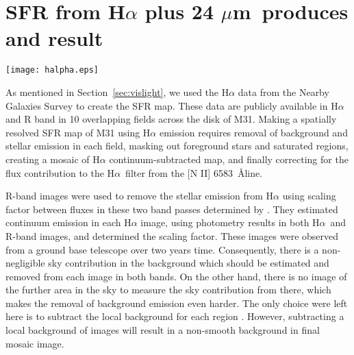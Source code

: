 \documentclass[useAMS,usenatbib]{mn2e}
\newcommand \halpha    {H$\alpha $\ }
\newcommand \um    {$\mu$m\ }
\begin{document}

\appendix
\section{SFR from H$\alpha$ plus 24 \um produces and result}
\label{app:halpha}


\begin{figure*}
\centering
\texttt{[image: halpha.eps]}
\caption{Mosaic created using the Montage programme from six fields of H$\alpha$ emission maps of the M31 from \cite{Massey07}. The result image from Montage was continuum subtracted and masked out for all point sources. Centre of the galaxy was masked out due to saturation of data in an R-band image.}
\label{fig:halpha}
\end{figure*}

As mentioned in Section~\ref{sec:vislight}, we used the H$\alpha$ data from the Nearby Galaxies Survey \citep{Massey07} to create the SFR map. These data are publicly available in H$\alpha$ and R band in 10 overlapping fields across the disk of M31. Making a spatially resolved SFR map of M31 using H$\alpha$ emission requires removal of background and stellar emission in each field, masking out foreground stars and saturated regions, creating a mosaic of H$\alpha$ continuum-subtracted map, and finally correcting for the flux contribution to the \halpha filter from the [N II] 6583~\AA line.

 R-band images were used to remove the stellar emission from H$\alpha$ using scaling factor between fluxes in these two band passes determined by \cite{Azimlu11}. They estimated continuum emission in each H$\alpha$ image, using photometry results in both \halpha and R-band images, and determined the scaling factor. These images were observed from a ground base telescope over two years time. Consequently, there is a non-negligible sky contribution in the background which should be estimated and removed from each image in both bands. On the other hand, there is no image of the further area in the sky to measure the sky contribution from there, which makes the removal of background emission even harder. The only choice were left here is to subtract the local background for each region%
. However, subtracting a local background of images will result in a non-smooth background in final mosaic image. 
\end{document}

